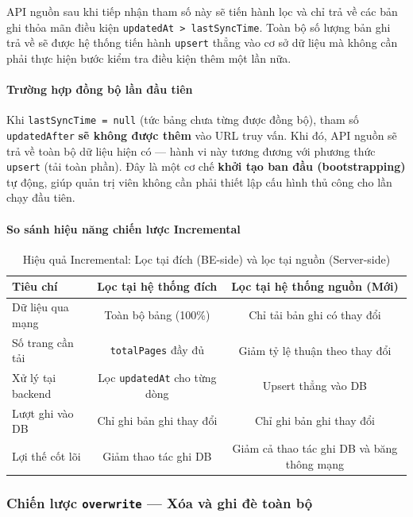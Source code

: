 API nguồn sau khi tiếp nhận tham số này sẽ tiến hành lọc và chỉ trả về các bản ghi thỏa mãn điều kiện \texttt{updatedAt > lastSyncTime}. Toàn bộ số lượng bản ghi trả về sẽ được hệ thống tiến hành \texttt{upsert} thẳng vào cơ sở dữ liệu mà không cần phải thực hiện bước kiểm tra điều kiện thêm một lần nữa.

\paragraph{Trường hợp đồng bộ lần đầu tiên}

Khi \texttt{lastSyncTime = null} (tức bảng chưa từng được đồng bộ), tham số \texttt{updatedAfter} \textbf{sẽ không được thêm} vào URL truy vấn. Khi đó, API nguồn sẽ trả về toàn bộ dữ liệu hiện có — hành vi này tương đương với phương thức \texttt{upsert} (tải toàn phần). Đây là một cơ chế \textbf{khởi tạo ban đầu (bootstrapping)} tự động, giúp quản trị viên không cần phải thiết lập cấu hình thủ công cho lần chạy đầu tiên.

\paragraph{So sánh hiệu năng chiến lược Incremental}

\begin{table}[H]
\centering
\caption{Hiệu quả Incremental: Lọc tại đích (BE-side) và lọc tại nguồn (Server-side)}
\label{tab:incremental-comparison}
\begin{tabular}{lcc}
\toprule
\textbf{Tiêu chí} & \textbf{Lọc tại hệ thống đích} & \textbf{Lọc tại hệ thống nguồn (Mới)} \\
\midrule
Dữ liệu qua mạng  & Toàn bộ bảng (100\%)      & Chỉ tải bản ghi có thay đổi \\
Số trang cần tải  & \texttt{totalPages} đầy đủ & Giảm tỷ lệ thuận theo thay đổi \\
Xử lý tại backend & Lọc \texttt{updatedAt} cho từng dòng & Upsert thẳng vào DB \\
Lượt ghi vào DB   & Chỉ ghi bản ghi thay đổi      & Chỉ ghi bản ghi thay đổi \\
Lợi thế cốt lõi   & Giảm thao tác ghi DB       & Giảm cả thao tác ghi DB và băng thông mạng \\
\bottomrule
\end{tabular}
\end{table}

\subsubsection{Chiến lược \texttt{overwrite} — Xóa và ghi đè toàn bộ}
\label{sec:strategy-overwrite}

